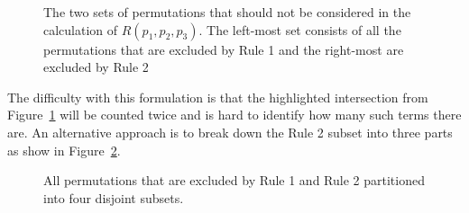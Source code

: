 \begin{figure}[H]
    \centering
    \caption{The two sets of permutations that should not be considered in the
    calculation of \(R(p_1, p_2, p_3)\). The left-most set consists of all the
    permutations that are excluded by Rule 1 and the right-most are excluded
    by Rule 2}
    \label{fig:venn_diagram_with_rules}
\end{figure}

The difficulty with this formulation is that the highlighted intersection from
Figure~\ref{fig:venn_diagram_with_rules} will
be counted twice and is hard to identify how many such terms there are.
An alternative approach is to break down the Rule 2 subset into three parts as
show in Figure~\ref{fig:venn_diagram_with_subsets}.

\begin{figure}[H]
    \centering
    \caption{All permutations that are excluded by Rule 1 and Rule 2
    partitioned into four disjoint subsets.}
    \label{fig:venn_diagram_with_subsets}
\end{figure}

